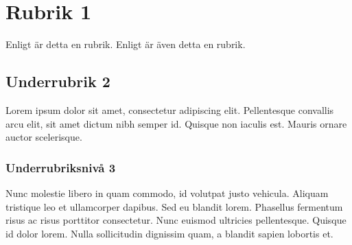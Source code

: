 \documentclass[paper=a4, fontsize=11pt]{article} %
\begin{document}
\section{Rubrik 1}
Enligt \cite{small} är detta en rubrik. Enligt \cite{big} är även detta en rubrik.
\subsection{Underrubrik 2}
Lorem ipsum dolor sit amet, consectetur adipiscing elit. Pellentesque convallis arcu elit, sit amet dictum nibh semper id. Quisque non iaculis est. Mauris ornare auctor scelerisque.
\subsubsection{Underrubriksnivå 3}
Nunc molestie libero in quam commodo, id volutpat justo vehicula. Aliquam tristique leo et ullamcorper dapibus. Sed eu blandit lorem. Phasellus fermentum risus ac risus porttitor consectetur. Nunc euismod ultricies pellentesque. Quisque id dolor lorem. Nulla sollicitudin dignissim quam, a blandit sapien lobortis et.
\end{document}
